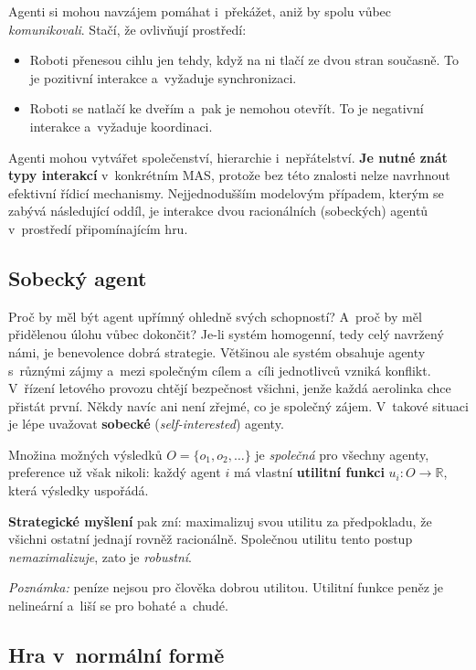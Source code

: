 \documentclass[11pt,a4paper]{article}
\theoremstyle{definition}
\begin{document}
Agenti si mohou navzájem pomáhat i~překážet, aniž by spolu vůbec \emph{komunikovali}. Stačí, že
ovlivňují prostředí:
\begin{itemize}
\item Roboti přenesou cihlu jen tehdy, když na ni tlačí ze dvou stran současně. To je pozitivní
  interakce a~vyžaduje synchronizaci.
\item Roboti se natlačí ke dveřím a~pak je nemohou otevřít. To je negativní interakce
  a~vyžaduje koordinaci.
\end{itemize}
Agenti mohou vytvářet společenství, hierarchie i~nepřátelství. \textbf{Je nutné znát typy
interakcí} v~konkrétním MAS, protože bez této znalosti nelze navrhnout efektivní řídicí
mechanismy. Nejjednodušším modelovým případem, kterým se zabývá následující oddíl, je
interakce dvou racionálních (sobeckých) agentů v~prostředí připomínajícím hru.
\subsection{Sobecký agent}

Proč by měl být agent upřímný ohledně svých schopností? A~proč by měl přidělenou úlohu vůbec
dokončit? Je-li systém homogenní, tedy celý navržený námi, je benevolence dobrá strategie.
Většinou ale systém obsahuje agenty s~různými zájmy a~mezi společným cílem a~cíli jednotlivců
vzniká konflikt. V~řízení letového provozu chtějí bezpečnost všichni, jenže každá aerolinka
chce přistát první. Někdy navíc ani není zřejmé, co je společný zájem. V~takové situaci je lépe
uvažovat \textbf{sobecké} (\emph{self-interested}) agenty.

\begin{defbox}
Množina možných výsledků $O = \{o_1, o_2, \dots\}$ je \emph{společná} pro všechny agenty,
preference už však nikoli: každý agent $i$ má vlastní \textbf{utilitní funkci}
$u_i : O \to \mathbb{R}$, která výsledky uspořádá.

\textbf{Strategické myšlení} pak zní: maximalizuj svou utilitu za předpokladu, že všichni
ostatní jednají rovněž racionálně. Společnou utilitu tento postup \emph{nemaximalizuje}, zato
je \emph{robustní}.

\emph{Poznámka:} peníze nejsou pro člověka dobrou utilitou. Utilitní funkce peněz je nelineární
a~liší se pro bohaté a~chudé.
\end{defbox}

\subsection{Hra v~normální formě}
\end{document}
